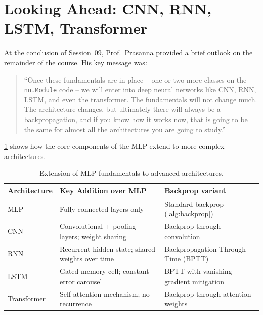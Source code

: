\documentclass[12pt,a4paper]{article}
\begin{document}
\section{Looking Ahead: CNN, RNN, LSTM, Transformer}
\label{sec:lookahead}

At the conclusion of Session~09, Prof.\ Prasanna provided a brief
outlook on the remainder of the course.  His key message was:

\begin{quote}
  ``Once these fundamentals are in place -- one or two more classes on
  the \texttt{nn.Module} code -- we will enter into deep neural networks
  like CNN, RNN, LSTM, and even the transformer.  The fundamentals will
  not change much.  The architecture changes, but ultimately there will
  always be a backpropagation, and if you know how it works now, that is
  going to be the same for almost all the architectures you are going
  to study.''
\end{quote}

\cref{tab:architecture_comparison} shows how the core components of the
MLP extend to more complex architectures.

\begin{table}[htbp]
  \centering
  \caption{Extension of MLP fundamentals to advanced architectures.}
  \label{tab:architecture_comparison}
  \begin{tabularx}{\linewidth}{lXX}
    \toprule
    \textbf{Architecture} & \textbf{Key Addition over MLP}
                          & \textbf{Backprop variant} \\
    \midrule
    MLP           & Fully-connected layers only
                  & Standard backprop (\cref{alg:backprop}) \\
    CNN           & Convolutional + pooling layers; weight sharing
                  & Backprop through convolution \\
    RNN           & Recurrent hidden state; shared weights over time
                  & Backpropagation Through Time (BPTT) \\
    LSTM          & Gated memory cell; constant error carousel
                  & BPTT with vanishing-gradient mitigation \\
    Transformer   & Self-attention mechanism; no recurrence
                  & Backprop through attention weights \\
    \bottomrule
  \end{tabularx}
\end{table}
\end{document}

